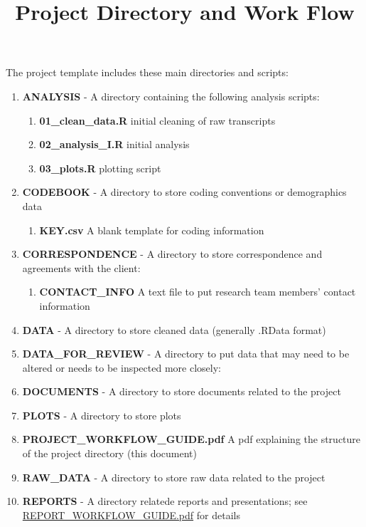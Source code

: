 \documentclass{article}\usepackage[]{graphicx}\usepackage[]{color}
\begin{document}
\title{Project Directory and Work Flow}
\author{}
\date{}
\maketitle

The project template includes these main directories and scripts:

\begin{enumerate}
  \item \textbf{ANALYSIS} - A directory containing the following analysis scripts:
  \begin{enumerate}
    \item \textbf{01\_clean\_data.R} initial cleaning of raw transcripts
    \item \textbf{02\_analysis\_I.R} initial analysis
    \item \textbf{03\_plots.R} plotting script
  \end{enumerate}
  \item \textbf{CODEBOOK} - A directory to store coding conventions or demographics data
  \begin{enumerate}
    \item \textbf{KEY.csv} A blank template for coding information
  \end{enumerate}  
  \item \textbf{CORRESPONDENCE} - A directory to store correspondence and agreements 
     with the client:
  \begin{enumerate}
     \item \textbf{CONTACT\_INFO} A text file to put research team members' 
       contact information
  \end{enumerate}  
  \item \textbf{DATA} - A directory to store cleaned data (generally .RData 
     format)
  \item \textbf{DATA\_FOR\_REVIEW} - A directory to put data that may need to be altered or needs to be inspected more closely:
  \item \textbf{DOCUMENTS} - A directory to store documents related to the project
  \item \textbf{PLOTS} - A directory to store plots
  \item \textbf{PROJECT\_WORKFLOW\_GUIDE.pdf} A pdf explaining the structure of the project directory (this document) 
  \item \textbf{RAW\_DATA} - A directory to store raw data related to the project 
  \item \textbf{REPORTS} - A directory relatede reports and presentations; see \href{https://dl.dropbox.com/u/61803503/packages/REPORT_WORKFLOW_GUIDE.pdf}{REPORT\_WORKFLOW\_GUIDE.pdf} for details

\end{enumerate}
\end{document}
